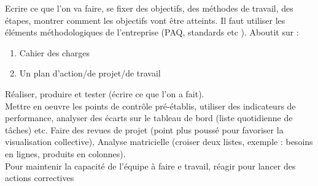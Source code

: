  Ecrire ce que l'on va faire, se fixer des objectifs, des méthodes de travail, des étapes, montrer comment les objectifs vont être atteints. Il faut utiliser les éléments méthodologiques de l'entreprise (PAQ, standards etc ). Aboutit sur :
\begin{enumerate}
	\item Cahier des charges
	\item Un plan d'action/de projet/de travail
\end{enumerate}

 Réaliser, produire et tester (écrire ce que l'on a fait). \\

 Mettre en oeuvre les points de contrôle pré-établis, utiliser des indicateurs de performance, analyser des écarts sur le tableau de bord (liste quotidienne de tâches) etc. Faire des revues de projet (point plus poussé pour favoriser la visualisation collective), Analyse matricielle (croiser deux listes, exemple : besoins en lignes, produits en colonnes). \\

 Pour maintenir la capacité de l'équipe à faire e travail, réagir pour lancer des actions correctives
